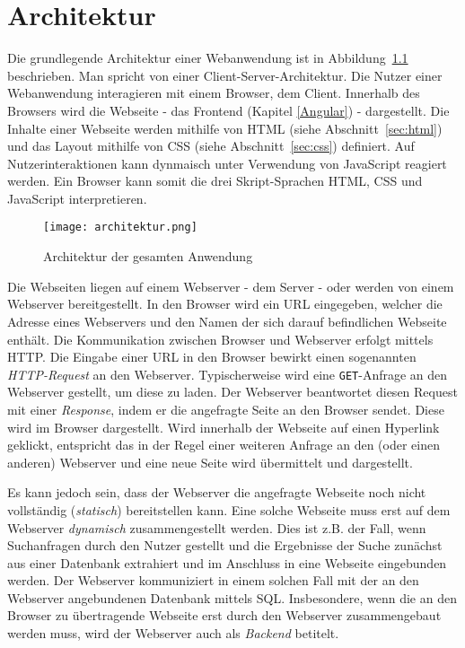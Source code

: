 \chapter{Architektur}

Die grundlegende Architektur einer Webanwendung ist in Abbildung~\ref{img:architektur} beschrieben. Man spricht von einer Client-Server-Architektur. Die Nutzer einer Webanwendung interagieren mit einem Browser, dem Client. Innerhalb des Browsers wird die Webseite - das Frontend (Kapitel \ref{Angular}) - dargestellt. Die Inhalte einer Webseite werden mithilfe von \ac{HTML} (siehe Abschnitt~\ref{sec:html}) und das Layout mithilfe von \ac{CSS} (siehe Abschnitt~\ref{sec:css}) definiert. Auf Nutzerinteraktionen kann dynmaisch unter Verwendung von JavaScript reagiert werden. Ein Browser kann somit die drei Skript-Sprachen HTML, CSS und JavaScript interpretieren.

\begin{figure}[htbp]
    \centering
    \texttt{[image: architektur.png]}
    \caption{Architektur der gesamten Anwendung}
    \label{img:architektur}
\end{figure}

Die Webseiten liegen auf einem Webserver - dem Server - oder werden von einem Webserver bereitgestellt. In den Browser wird ein \ac{URL} eingegeben, welcher die Adresse eines Webservers und den Namen der sich darauf befindlichen Webseite enthält. Die Kommunikation zwischen Browser und Webserver erfolgt mittels \ac{HTTP}. Die Eingabe einer URL in den Browser bewirkt einen sogenannten \textit{HTTP-Request} an den Webserver. Typischerweise wird eine \texttt{GET}-Anfrage an den Webserver gestellt, um diese zu laden. Der Webserver beantwortet diesen Request mit einer \textit{Response}, indem er die angefragte Seite an den Browser sendet. Diese wird im Browser dargestellt. Wird innerhalb der Webseite auf einen Hyperlink geklickt, entspricht das in der Regel einer weiteren Anfrage an den (oder einen anderen) Webserver und eine neue Seite wird übermittelt und dargestellt.

Es kann jedoch sein, dass der Webserver die angefragte Webseite noch nicht vollständig (\textit{statisch}) bereitstellen kann. Eine solche Webseite muss erst auf dem Webserver \textit{dynamisch} zusammengestellt werden. Dies ist z.B. der Fall, wenn Suchanfragen durch den Nutzer gestellt und die Ergebnisse der Suche zunächst aus einer Datenbank extrahiert und im Anschluss in eine Webseite eingebunden werden. Der Webserver kommuniziert in einem solchen Fall mit der an den Webserver angebundenen Datenbank mittels \ac{SQL}. Insbesondere, wenn die an den Browser zu übertragende Webseite erst durch den Webserver \glqq zusammengebaut\grqq{} werden muss, wird der Webserver auch als \textit{Backend} betitelt.

